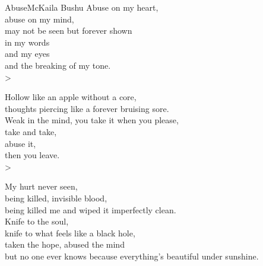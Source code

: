 
\begin{poetry}{Abuse}{McKaila Bushu}
Abuse on my heart,\\
abuse on my mind,\\
may not be seen but forever shown\\
in my words\\
and my eyes\\
and the breaking of my tone.\\>

Hollow like an apple without a core,\\
thoughts piercing like a forever bruising sore.\\
Weak in the mind, you take it when you please,\\
take and take,\\
abuse it,\\
then you leave.\\>

My hurt never seen,\\
being killed, invisible blood,\\
being killed me and wiped it imperfectly clean.\\
Knife to the soul,\\
knife to what feels like a black hole,\\
taken the hope, abused the mind\\
but no one ever knows because everything's beautiful under sunshine.
\end{poetry}

